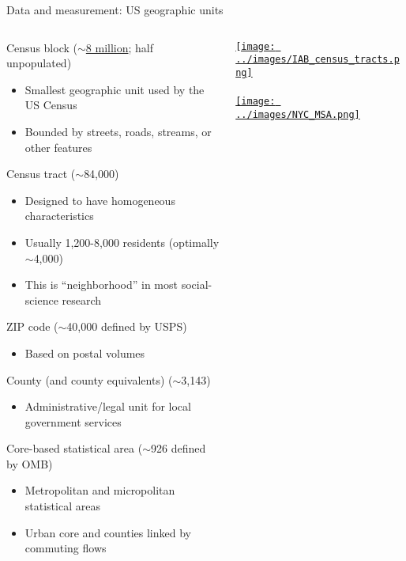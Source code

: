 \documentclass[11pt,notes=hide,aspectratio=169]{beamer}
\begin{document}
\begin{frame}{Data and measurement: US geographic units}
\begin{columns}\begin{column}{0.68\textwidth}{\footnotesize
Census block ($\sim$\href{https://www.census.gov/geographies/reference-files/time-series/geo/tallies.html}{8 million}; half unpopulated) \vspace{-1mm}
\begin{itemize}\itemsep-0.2em
    \item Smallest geographic unit used by the US Census
    \item Bounded by streets, roads, streams, or other features
\end{itemize}
Census tract ($\sim$84,000) \vspace{-1mm}
\begin{itemize}\itemsep-0.2em
    \item Designed to have homogeneous characteristics
    \item Usually 1,200-8,000 residents (optimally $\sim$4,000)
	\item This is ``neighborhood'' in most social-science research
\end{itemize}
ZIP code ($\sim$40,000 defined by USPS) \vspace{-1mm}
\begin{itemize}\itemsep-0.2em
	\item Based on postal volumes
\end{itemize}
County (and county equivalents) ($\sim$3,143) \vspace{-1mm}
\begin{itemize}\itemsep-0.2em
    \item Administrative/legal unit for local government services
\end{itemize}
Core-based statistical area ($\sim$926 defined by OMB) \vspace{-1mm}
\begin{itemize}\itemsep-0.2em
    \item Metropolitan and micropolitan statistical areas
	\item Urban core and counties linked by commuting flows
\end{itemize}
}\end{column}
\begin{column}{0.30\textwidth}
\href{https://www.nyc.gov/assets/planning/download/pdf/about/publications/maps/mn-census-tracts-map-rotated.pdf}{%
\texttt{[image: ../images/IAB\_census\_tracts.png]}}\\ \ \\
\href{https://censusreporter.org/profiles/31000US35620-new-york-newark-jersey-city-ny-nj-metro-area/}{%
\texttt{[image: ../images/NYC\_MSA.png]}}
\end{column}\end{columns}
\end{frame}
\end{document}
